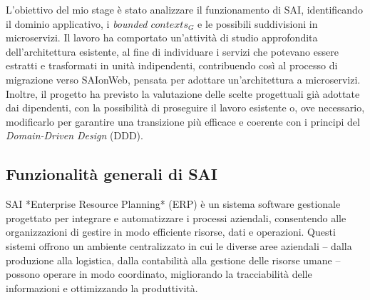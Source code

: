     \vspace{0.2 em}
    \noindent L'obiettivo del mio stage è stato analizzare il funzionamento di SAI, identificando il dominio applicativo, i \textit{bounded $contexts_G$} e le possibili suddivisioni in microservizi. Il lavoro ha comportato un'attività di studio approfondita dell'architettura esistente, al fine di individuare i servizi che potevano essere estratti e trasformati in unità indipendenti, contribuendo così al processo di migrazione verso SAIonWeb, pensata per adottare un'architettura a microservizi. Inoltre, il progetto ha previsto la valutazione delle scelte progettuali già adottate dai dipendenti, con la possibilità di proseguire il lavoro esistente o, ove necessario, modificarlo per garantire una transizione più efficace e coerente con i principi del \textit{Domain-Driven Design} (DDD). 
    
        \subsection{Funzionalità generali di SAI}
        SAI *Enterprise Resource Planning* (ERP) è un sistema software gestionale progettato per integrare e automatizzare i processi aziendali, consentendo alle organizzazioni di gestire in modo efficiente risorse, dati e operazioni. Questi sistemi offrono un ambiente centralizzato in cui le diverse aree aziendali – dalla produzione alla logistica, dalla contabilità alla gestione delle risorse umane – possono operare in modo coordinato, migliorando la tracciabilità delle informazioni e ottimizzando la produttività.  


